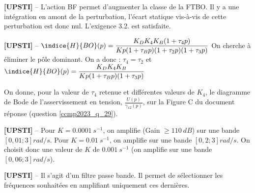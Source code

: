 \ifprof
\begin{corrige}%
\textbf{[UPSTI]} -- L’action BF permet d’augmenter la classe de la FTBO. Il y a une intégration en amont de la perturbation, l’écart statique vis-à-vis de cette perturbation est donc nul. L’exigence 3.2. est satisfaite.
\end{corrige}
\else
\fi

\ifprof
\begin{corrige}%
\textbf{[UPSTI]} -- 
$\indice{H}{BO} (p)=\dfrac{K_D K_4 K_B (1+\tau_4 p)}{Kp(1+\tau_B p)(1+\tau_2 p)(1+\tau_3 p)}$
On cherche à éliminer le pôle dominant. On a donc : $\tau_4=\tau_2$ et  
$\indice{H}{BO} (p)=\dfrac{K_D K_4 K_B}{Kp(1+\tau_B p)(1+\tau_3 p)}$

\end{corrige}
\else
\fi

\ifprof
\else
On donne, pour la valeur de $\tau_{4}$ retenue et différentes valeurs de $K_{4}$, le diagramme de Bode de l'asservissement en tension, $\frac{U(p)}{\gamma_{x 2}(p)}$, sur la Figure C du document réponse (question \ref{ccmp2023_q_29}).
\fi

\ifprof
\begin{corrige}%
\textbf{[UPSTI]} --
Pour $K = \SI{0,0001}{s^{-1}}$, on amplifie (Gain $\geq \SI{110}{dB}$) sur une bande $\left[0,01 ; 3\right] \si{rad/s}$.
Pour $K = \SI{0,01}{s^{-1}}$, on amplifie sur une bande $\left[0,2 ; 3\right] \si{rad/s}$.
On choisit donc une valeur de $K$ de $\SI{0,001}{s^{-1}}$ (on amplifie sur une bande $\left[0,06 ; 3\right] \si{rad/s}$).

\end{corrige}
\else
\fi

\ifprof
\begin{corrige}%
\textbf{[UPSTI]} -- 
Il s’agit d’un filtre passe bande. Il permet de sélectionner les fréquences souhaitées en amplifiant uniquement ces dernières.
\end{corrige}
\else
\fi



